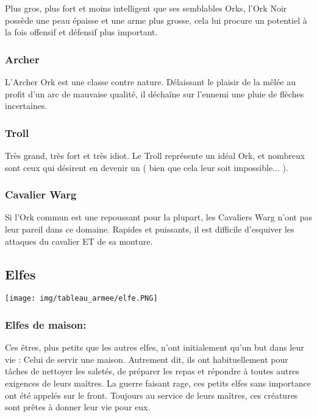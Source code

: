 \documentclass[a4paper]{article}
\begin{document}
	\quad Plus gros, plus fort et moins intelligent que ses semblables Orks, l'Ork Noir possède une peau épaisse et une arme plus grosse, cela lui procure un potentiel à la fois offensif et défensif plus important.

	\subsubsection{Archer}
	
	\quad L'Archer Ork est une classe contre nature. Délaissant le plaisir de la mêlée au profit d'un arc de mauvaise qualité, il déchaîne sur l'ennemi une pluie de flèches incertaines.

	\subsubsection{Troll}
	
	\quad Très grand, très fort et très idiot. Le Troll représente un idéal Ork, et nombreux sont ceux qui désirent en devenir un ( bien que cela leur soit impossible... ).

	\subsubsection{Cavalier Warg}

	\quad Si l'Ork commun est une repoussant pour la plupart, les Cavaliers Warg n'ont pas leur pareil dans ce domaine. Rapides et puissants, il est difficile d'esquiver les attaques du cavalier ET de sa monture.

	\newpage
\subsection{Elfes}


	\texttt{[image: img/tableau\_armee/elfe.PNG]}
	
	\subsubsection{Elfes de maison: }
	
	\quad Ces êtres, plus petits que les autres elfes, n'ont initialement qu'un but dans leur vie : Celui de servir une maison. Autrement dit, ils ont habituellement pour tâches de nettoyer les saletés, de préparer les repas et répondre à toutes autres exigences de leurs maîtres. La guerre faisant rage, ces petits elfes sans importance ont été appelés sur le front. Toujours au service de leurs maîtres, ces créatures sont prêtes à donner leur vie pour eux.
	
\end{document}
